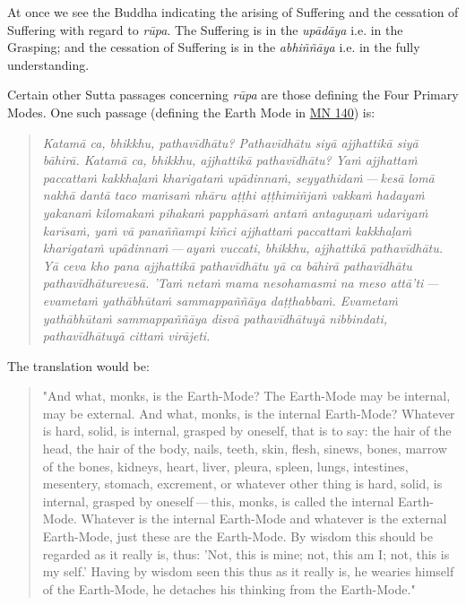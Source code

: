 At once we see the Buddha indicating the arising of Suffering and the
cessation of Suffering with regard to \emph{rūpa}. The Suffering is in the
\emph{upādāya} i.e. in the Grasping; and the cessation of Suffering is in the
\emph{abhiññāya} i.e. in the fully understanding.


Certain other Sutta passages concerning \emph{rūpa} are those defining the Four Primary Modes.
One such passage (defining the Earth Mode in \href{https://suttacentral.net/mn140/en/bodhi}{MN 140}) is:


\begin{quotation}
\emph{Katamā ca, bhikkhu, pathavīdhātu?
Pathavīdhātu siyā ajjhattikā siyā bāhirā.
Katamā ca, bhikkhu, ajjhattikā pathavīdhātu?
Yaṁ ajjhattaṁ paccattaṁ kakkhaḷaṁ kharigataṁ upādinnaṁ, seyyathidaṁ — kesā lomā nakhā dantā taco maṁsaṁ nhāru aṭṭhi aṭṭhimiñjaṁ vakkaṁ hadayaṁ yakanaṁ kilomakaṁ pihakaṁ papphāsaṁ antaṁ antaguṇaṁ udariyaṁ karīsaṁ,
yaṁ vā panaññampi kiñci ajjhattaṁ paccattaṁ kakkhaḷaṁ kharigataṁ upādinnaṁ — ayaṁ vuccati, bhikkhu, ajjhattikā pathavīdhātu.
Yā ceva kho pana ajjhattikā pathavīdhātu yā ca bāhirā pathavīdhātu pathavīdhāturevesā.
'Taṁ netaṁ mama nesohamasmi na meso attā’ti — evametaṁ yathābhūtaṁ sammappaññāya daṭṭhabbaṁ.
Evametaṁ yathābhūtaṁ sammappaññāya disvā pathavīdhātuyā nibbindati, pathavīdhātuyā cittaṁ virājeti.}


\end{quotation}

The translation would be:


\begin{quotation}
"And what, monks, is the Earth-Mode? The Earth-Mode may be internal, may
be external. And what, monks, is the internal Earth-Mode? Whatever is
hard, solid, is internal, grasped by oneself, that is to say: the hair of
the head, the hair of the body, nails, teeth, skin, flesh, sinews,
bones, marrow of the bones, kidneys, heart, liver, pleura, spleen,
lungs, intestines, mesentery, stomach, excrement, or whatever other
thing is hard, solid, is internal, grasped by oneself — this, monks, is
called the internal Earth-Mode. Whatever is the internal Earth-Mode and
whatever is the external Earth-Mode, just these are the Earth-Mode. By
wisdom this should be regarded as it really is, thus: 'Not, this is
mine; not, this am I; not, this is my self.' Having by wisdom seen this
thus as it really is, he wearies himself of the Earth-Mode, he detaches
his thinking from the Earth-Mode."


\end{quotation}

